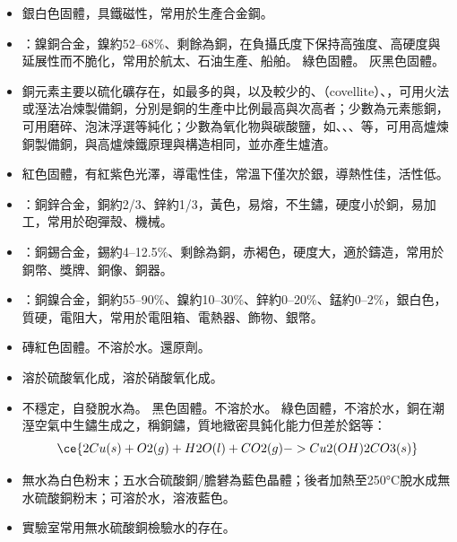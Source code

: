 \documentclass[a4paper,12pt]{report}
\begin{document}
\begin{itemize}
\begin{itemize}
遇過量或加熱變藍，因吸熱反應：
\[\ce{[Co(H2O)6]^{2+}(aq)\text{(粉紅)} + 4Cl^-(aq) <=> [CoCl4]^{2-}(aq)\text{(藍)} + 6H2O(l)}\]
\bit
\item 銀白色固體，具鐵磁性，常用於生產合金鋼。
\item {}：鎳銅合金，鎳約52–68\%、剩餘為銅，在負攝氏度下保持高強度、高硬度與延展性而不脆化，常用於航太、石油生產、船舶。
\eit
{}
綠色固體。
灰黑色固體。
\bit
\item 銅元素主要以硫化礦存在，如最多的與，以及較少的、（covellite）、，可用火法或溼法冶煉製備銅，分別是銅的生產中比例最高與次高者；少數為元素態銅，可用磨碎、泡沫浮選等純化；少數為氧化物與碳酸鹽，如、、、等，可用高爐煉銅製備銅，與高爐煉鐵原理與構造相同，並亦產生爐渣。
\item 紅色固體，有紅紫色光澤，導電性佳，常溫下僅次於銀，導熱性佳，活性低。
\item {}：銅鋅合金，銅約2/3、鋅約1/3，黃色，易熔，不生鏽，硬度小於銅，易加工，常用於砲彈殼、機械。
\item {}：銅錫合金，錫約4–12.5\%、剩餘為銅，赤褐色，硬度大，適於鑄造，常用於銅幣、獎牌、銅像、銅器。
\item {}：銅鎳合金，銅約55–90\%、鎳約10–30\%、鋅約0–20\%、錳約0–2\%，銀白色，質硬，電阻大，常用於電阻箱、電熱器、飾物、銀幣。
\eit
{}
\bit
\item 磚紅色固體。不溶於水。還原劑。
\item 溶於硫酸氧化成，溶於硝酸氧化成。
\item {}不穩定，自發脫水為。
\eit
{}
黑色固體。不溶於水。
綠色固體，不溶於水，銅在潮溼空氣中生鏽生成之，稱銅鏽，質地緻密具鈍化能力但差於鋁等：
\[\ce{2Cu(s) + O2(g) + H2O(l) + CO2(g) -> Cu2(OH)2CO3(s)}\]
\bit
\item 無水為白色粉末；五水合硫酸銅/膽礬為藍色晶體；後者加熱至250°C脫水成無水硫酸銅粉末；可溶於水，溶液藍色。
\item 實驗室常用無水硫酸銅檢驗水的存在。

\end{itemize}
\end{itemize}
\end{document}
